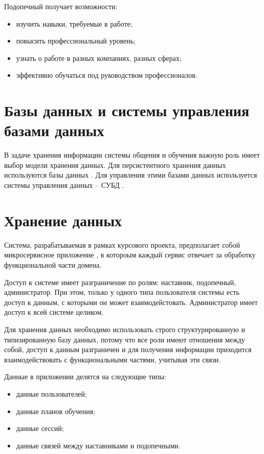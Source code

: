 Подопечный получает возможности:
\begin{itemize}
    \item изучить навыки, требуемые в работе;
    \item повысить профессиональный уровень;
    \item узнать о работе в разных компаниях, разных сферах;
    \item эффективно обучаться под руководством профессионалов.
\end{itemize}

\section{Базы данных и системы управления базами данных}

В задаче хранения информации системы общения и обучения важную роль имеет выбор модели хранения данных.
Для персистентного хранения данных используются базы данных \cite{database}.
Для управления этими базами данных используется системы управления данных -- СУБД \cite{subd}.

\section{Хранение данных}

Система, разрабатываемая в рамках курсового проекта, предполагает собой микросервисное приложение \cite{microservice}, в котороым каждый сервис отвечает за обработку функциональной части домена.

Доступ к системе имеет разграничение по ролям: наставник, подопечный, администратор. При этом, только у одного типа пользователя системы есть доступ к данным, с которыми он может взаимодейстовать.
Администратор имеет доступ к всей системе целиком.

Для хранения данных необходимо использовать строго структурированную и типизированную базу данных, потому что все роли
имеют отношения между собой, доступ к данным разграничен и для получения информации приходится взаимодействовать с функциональными частями,
учитывая эти связи.

Данные в приложении делятся на следующие типы:
\begin{itemize}
    \item данные пользователей;
    \item данные планов обучения;
    \item данные сессий;
    \item данные связей между наставниками и подопечными.
\end{itemize}

